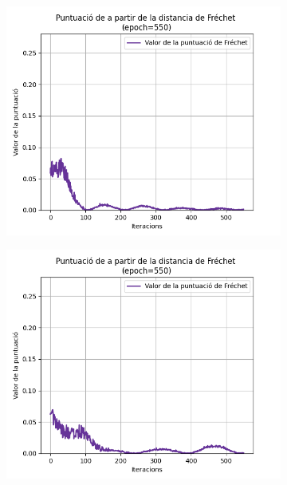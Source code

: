 \begin{figure}
	\begin{subfigure}[b]{.32\linewidth}
		\includegraphics[width=\linewidth]{figures/data/FD_score_1.png}
		\caption{}
	\end{subfigure}
	\begin{subfigure}[b]{.32\linewidth}
		\includegraphics[width=\linewidth]{figures/data/FD_score_2.png}
		\caption{}
	\end{subfigure}
	\begin{subfigure}[b]{.32\linewidth}

\end{subfigure}
\end{figure}
